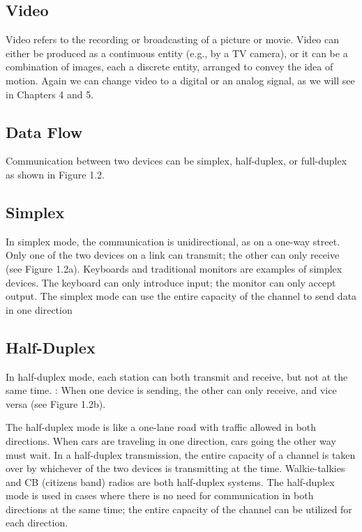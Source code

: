 \subsection*{Video}
Video refers to the recording or broadcasting of a picture or movie. Video can either be produced as a continuous entity (e.g., by a TV camera), or it can be a combination of images, each a discrete entity, arranged to convey the idea of motion. Again we can change video to a digital or an analog signal, as we will see in Chapters 4 and 5.

\subsection{Data Flow}
Communication between two devices can be simplex, half-duplex, or full-duplex as shown in Figure 1.2.

\subsection*{Simplex}
In simplex mode, the communication is unidirectional, as on a one-way street. Only one of the two devices on a link can transmit; the other can only receive (see Figure 1.2a). Keyboards and traditional monitors are examples of simplex devices. The keyboard can only introduce input; the monitor can only accept output. The simplex mode can use the entire capacity of the channel to send data in one direction

\subsection*{Half-Duplex}
In half-duplex mode, each station can both transmit and receive, but not at the same time. : When one device is sending, the other can only receive, and vice versa (see Figure 1.2b).

The half-duplex mode is like a one-lane road with traffic allowed in both directions. When cars are traveling in one direction, cars going the other way must wait. In a half-duplex transmission, the entire capacity of a channel is taken over by whichever of the two devices is transmitting at the time. Walkie-talkies and CB (citizens band) radios are both half-duplex systems. The half-duplex mode is used in cases where there is no need for communication in both directions at the same time; the entire capacity of the channel can be utilized for each direction.

